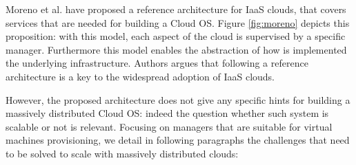 Moreno et al. have proposed a reference architecture \cite{moreno2012iaas} 
for IaaS clouds, that covers services that are needed for building a Cloud OS. 
Figure \ref{fig:moreno} depicts this proposition: with this model, each aspect 
of the cloud is supervised by a specific manager. Furthermore this model enables
the abstraction of how is implemented the underlying infrastructure. Authors 
argues that following a reference architecture is a key to the widespread 
adoption of IaaS clouds.

However, the proposed architecture does not give any specific hints for
building a massively distributed Cloud OS: indeed the question whether such 
system is scalable or not is relevant. Focusing on managers that are suitable 
for virtual machines provisioning, we detail in following paragraphs the 
challenges that need to be solved to scale with massively distributed clouds:



